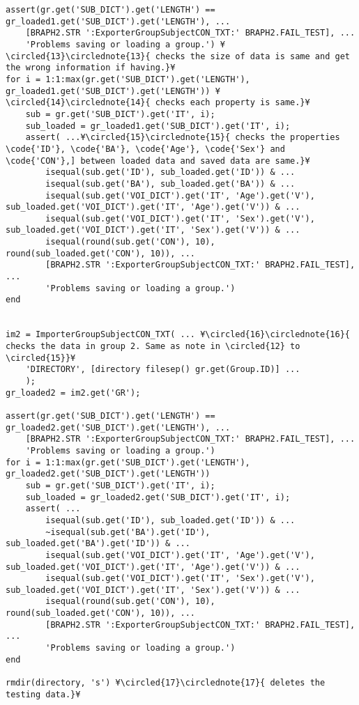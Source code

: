\documentclass{tufte-handout}
\begin{document}
\begin{lstlisting}
assert(gr.get('SUB_DICT').get('LENGTH') == gr_loaded1.get('SUB_DICT').get('LENGTH'), ...
	[BRAPH2.STR ':ExporterGroupSubjectCON_TXT:' BRAPH2.FAIL_TEST], ...
    'Problems saving or loading a group.') ¥\circled{13}\circlednote{13}{ checks the size of data is same and get the wrong information if having.}¥
for i = 1:1:max(gr.get('SUB_DICT').get('LENGTH'), gr_loaded1.get('SUB_DICT').get('LENGTH')) ¥\circled{14}\circlednote{14}{ checks each property is same.}¥
    sub = gr.get('SUB_DICT').get('IT', i);
    sub_loaded = gr_loaded1.get('SUB_DICT').get('IT', i);    
    assert( ...¥\circled{15}\circlednote{15}{ checks the properties \code{'ID'}, \code{'BA'}, \code{'Age'}, \code{'Sex'} and \code{'CON'},] between loaded data and saved data are same.}¥
        isequal(sub.get('ID'), sub_loaded.get('ID')) & ...
        isequal(sub.get('BA'), sub_loaded.get('BA')) & ... 
        isequal(sub.get('VOI_DICT').get('IT', 'Age').get('V'), sub_loaded.get('VOI_DICT').get('IT', 'Age').get('V')) & ... 
        isequal(sub.get('VOI_DICT').get('IT', 'Sex').get('V'), sub_loaded.get('VOI_DICT').get('IT', 'Sex').get('V')) & ...
        isequal(round(sub.get('CON'), 10), round(sub_loaded.get('CON'), 10)), ...
        [BRAPH2.STR ':ExporterGroupSubjectCON_TXT:' BRAPH2.FAIL_TEST], ...
        'Problems saving or loading a group.')    
end


im2 = ImporterGroupSubjectCON_TXT( ... ¥\circled{16}\circlednote{16}{ checks the data in group 2. Same as note in \circled{12} to \circled{15}}¥
    'DIRECTORY', [directory filesep() gr.get(Group.ID)] ...
    );
gr_loaded2 = im2.get('GR');

assert(gr.get('SUB_DICT').get('LENGTH') == gr_loaded2.get('SUB_DICT').get('LENGTH'), ...
	[BRAPH2.STR ':ExporterGroupSubjectCON_TXT:' BRAPH2.FAIL_TEST], ...
    'Problems saving or loading a group.')
for i = 1:1:max(gr.get('SUB_DICT').get('LENGTH'), gr_loaded2.get('SUB_DICT').get('LENGTH'))
    sub = gr.get('SUB_DICT').get('IT', i);
    sub_loaded = gr_loaded2.get('SUB_DICT').get('IT', i);
    assert( ...
        isequal(sub.get('ID'), sub_loaded.get('ID')) & ...
        ~isequal(sub.get('BA').get('ID'), sub_loaded.get('BA').get('ID')) & ...
        isequal(sub.get('VOI_DICT').get('IT', 'Age').get('V'), sub_loaded.get('VOI_DICT').get('IT', 'Age').get('V')) & ... 
        isequal(sub.get('VOI_DICT').get('IT', 'Sex').get('V'), sub_loaded.get('VOI_DICT').get('IT', 'Sex').get('V')) & ...
        isequal(round(sub.get('CON'), 10), round(sub_loaded.get('CON'), 10)), ...
        [BRAPH2.STR ':ExporterGroupSubjectCON_TXT:' BRAPH2.FAIL_TEST], ...
        'Problems saving or loading a group.')    
end

rmdir(directory, 's') ¥\circled{17}\circlednote{17}{ deletes the testing data.}¥
\end{lstlisting}
\end{document}
